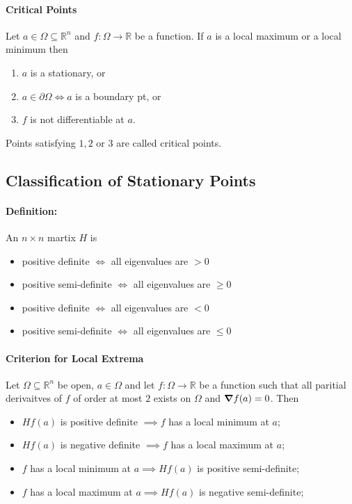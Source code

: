 \paragraph{Critical Points}
Let \(a\in\Omega\subseteq\mathbb R^n\) and \(f:\Omega \to \mathbb R\) be a function. If \(a\)
is a local maximum or a local minimum then
\begin{enumerate}
    \item \(a\) is a stationary, or
    \item \(a \in \partial\Omega \Longleftrightarrow a\) is a boundary pt, or
    \item \(f\) is not differentiable at \(a\).
\end{enumerate}
Points satisfying \(1,2\) or \(3\) are called critical points.

\subsection{Classification of Stationary Points}
\paragraph{Definition:}
An \(n \times n\) martix \(H\) is 
\begin{itemize}
    \item positive definite \(\iff\) all eigenvalues are \(> 0\)
    \item positive semi-definite \(\iff\) all eigenvalues are \(\geq 0\)
    \item positive definite \(\iff\) all eigenvalues are \(< 0\)
    \item positive semi-definite \(\iff\) all eigenvalues are \(\leq 0\)
\end{itemize}

\paragraph{Criterion for Local Extrema}
Let \(\Omega \subseteq \mathbb R^n\) be open, \(a\in\Omega\) and let \(f:\Omega \to \mathbb R\)
be a function such that all paritial derivaitves of \(f\) of order at most \(2\) exists on \(\Omega\) and \(\grad f(a) = 0\). Then
\begin{itemize}
    \item \(Hf(a)\) is positive definite \(\implies f\) has a local minimum at \(a\);
    \item \(Hf(a)\) is negative definite \(\implies f\) has a local maximum at \(a\);
    \item \(f\) has a local minimum at \(a \implies Hf(a)\) is positive semi-definite;
    \item \(f\) has a local maximum at \(a \implies Hf(a)\) is negative semi-definite;
\end{itemize}

